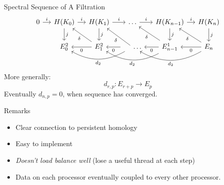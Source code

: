 \begin{frame}{Spectral Sequence of A Filtration}
{\[\begin{tikzcd}[ampersand replacement=\&, column sep=small]
0 \arrow{r}{i} \& H(K_0 \arrow{r}{i}\arrow{d}{j}) \& H(K_1 \arrow{r}{i}\arrow{d}{j})    \& \ldots \arrow{r}{i} \& H(K_{n-1}) \arrow{r}{i} \arrow{d}{j} \& H(K_n\arrow{d}{j}) \\ 		
\&     E^2_0 \&	  \arrow{l}{0} \arrow{ul}{\delta}  E^2_1 \& \arrow{l}{0} \arrow[bend left]{ll}{d_{2}} \arrow{ul}{\delta} \hspace{.5cm} \ldots  	 \& \arrow{l}{0} \arrow[bend left]{ll}{d_{2}} \arrow{ul}{\delta}E^1_{n-1}	 \& \arrow{l}{0} \arrow[bend left]{ll}{d_{2}} \arrow{ul}{\delta} E_n
\end{tikzcd}
\]
\pause
More generally:
\[ d_{r,p}: E_{r+p} \rightarrow E_p \]
Eventually $d_{n,p} = 0$, when sequence has converged.  
}
\end{frame}
\begin{frame}{Remarks}
\begin{itemize}
\item<1-> Clear connection to persistent homology
\item<2-> Easy to implement
\item<3-> \emph{Doesn't load balance well} (lose a useful thread at each step)
\item<4-> Data on each processor eventually coupled to every other processor.
\end{itemize}
\end{frame}